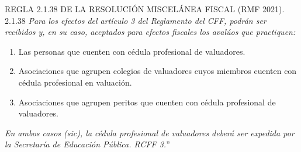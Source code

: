 

\textcolor{principal}{REGLA 2.1.38 DE LA RESOLUCI\'ON MISCEL\'ANEA FISCAL (RMF 2021).}\\


\textcolor{secundario}{2.1.38} \textit{Para los efectos del artículo 3 del Reglamento del CFF, podr\'an ser recibidos y, en su caso, aceptados para efectos fiscales los aval\'uos que practiquen:} \\

\begin{enumerate}[\indent I.]
\item Las personas que cuenten con c\'edula profesional de valuadores. 
\item Asociaciones que agrupen colegios de valuadores cuyos miembros cuenten con c\'edula profesional en valuaci\'on. 
\item Asociaciones que agrupen peritos que cuenten con c\'edula profesional de valuadores. 

\end{enumerate}


\textit{En ambos casos (sic), la c\'edula profesional de valuadores deber\'a ser expedida por la Secretar\'ia de Educaci\'on P\'ublica. RCFF 3.}''\\

